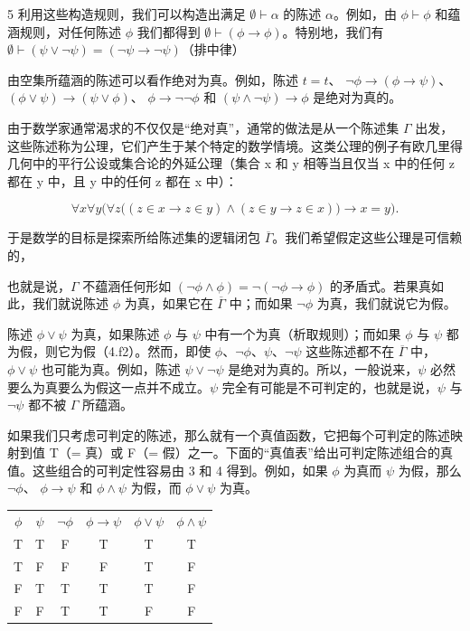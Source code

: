 5 利用这些构造规则，我们可以构造出满足  $ \emptyset \vdash \alpha $ 的陈述  $ \alpha $。例如，由  $ \phi \vdash \phi $ 和蕴涵规则，对任何陈述  $ \phi $ 我们都得到  $ \emptyset \vdash (\phi \to \phi) $。特别地，我们有  $ \emptyset \vdash (\psi \lor \neg \psi) = (\neg \psi \to \neg \psi) $（排中律）

由空集所蕴涵的陈述可以看作绝对为真。例如，陈述  $ t = t $、 $ \neg\phi \to (\phi \to \psi) $、 $ (\phi \lor \psi) \to (\psi \lor \phi) $、 $ \phi \to \neg\neg\phi $ 和  $ (\psi \land \neg\psi) \to \phi $ 是绝对为真的。

由于数学家通常渴求的不仅仅是“绝对真”，通常的做法是从一个陈述集  $ \Gamma $ 出发，这些陈述称为公理，它们产生于某个特定的数学情境。这类公理的例子有欧几里得几何中的平行公设或集合论的外延公理（集合 x 和 y 相等当且仅当 x 中的任何 z 都在 y 中，且 y 中的任何 z 都在 x 中）：

\[
\forall x\forall y\Big(\forall z\big((z\in x\to z\in y)\land(z\in y\to z\in x)\big)\to x=y\Big).
\]

于是数学的目标是探索所给陈述集的逻辑闭包  $ \overline{\Gamma} $。我们希望假定这些公理是可信赖的，

也就是说，$\Gamma$ 不蕴涵任何形如 $(\neg\phi \land \phi) = \neg(\neg\phi \to \phi)$ 的矛盾式。若果真如此，我们就说陈述 $\phi$ 为真，如果它在 $\overline{\Gamma}$ 中；而如果 $\neg\phi$ 为真，我们就说它为假。

陈述 $\phi \lor \psi$ 为真，如果陈述 $\phi$ 与 $\psi$ 中有一个为真（析取规则）；而如果 $\phi$ 与 $\psi$ 都为假，则它为假（4.f2）。然而，即使 $\phi$、$\neg\phi$、$\psi$、$\neg\psi$ 这些陈述都不在 $\overline{\Gamma}$ 中，$\phi \lor \psi$ 也可能为真。例如，陈述 $\psi \lor \neg\psi$ 是绝对为真的。所以，一般说来，$\psi$ 必然要么为真要么为假这一点并不成立。$\psi$ 完全有可能是不可判定的，也就是说，$\psi$ 与 $\neg\psi$ 都不被 $\Gamma$ 所蕴涵。

如果我们只考虑可判定的陈述，那么就有一个真值函数，它把每个可判定的陈述映射到值 T（= 真）或 F（= 假）之一。下面的“真值表”给出可判定陈述组合的真值。这些组合的可判定性容易由 3 和 4 得到。例如，如果  $ \phi $ 为真而  $ \psi $ 为假，那么  $ \neg\phi $、 $ \phi \to \psi $ 和  $ \phi \land \psi $ 为假，而  $ \phi \lor \psi $ 为真。

\begin{center}
\begin{tabular}{cccccc}
\toprule
$ \phi $ & $ \psi $ & $ \neg\phi $ & $ \phi \rightarrow \psi $ & $ \phi \lor \psi $ & $ \phi \land \psi $ \\
T & T & F & T & T & T \\
T & F & F & F & T & F \\
F & T & T & T & T & F \\
F & F & T & T & F & F \\
\bottomrule
\end{tabular}
\end{center}

